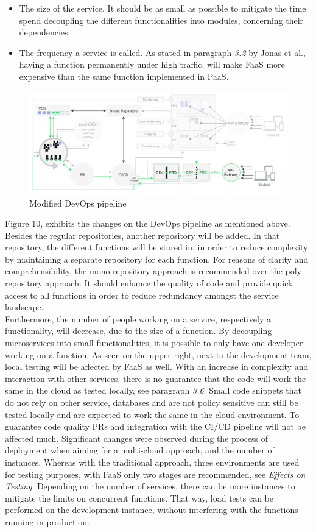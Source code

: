 \documentclass[a4paper,11pt, pagesize]{scrartcl}
\begin{document}
\begin{spacing}{1.2}
\begin{itemize}
  \item[2.] The size of the service. It should be as small as possible to mitigate the time spend decoupling the different functionalities into modules, concerning their dependencies.
  \item[3.] The frequency a service is called. As stated in paragraph \textit{3.2} by Jonas et al., having a function permanently under high traffic, will make FaaS more expensive than the same function implemented in PaaS.
\end{itemize}
\begin{figure}[H]
\label{fig:devopsModified}
\centering
\includegraphics[width=1\textwidth]{devopsModified}
\caption{Modified DevOps pipeline}
\end{figure}
Figure 10, exhibits the changes on the DevOps pipeline as mentioned above. Besides the regular repositories, another repository will be added. In that repository, the different functions will be stored in, in order to reduce complexity by maintaining a separate repository for each function. For reasons of clarity and comprehensibility, the mono-repository approach is recommended over the poly-repository approach. It should enhance the quality of code and provide quick access to all functions in order to reduce redundancy amongst the service landscape. \\Furthermore, the number of people working on a service, respectively a functionality, will decrease, due to the size of a function. By decoupling microservices into small functionalities, it is possible to only have one developer working on a function. As seen on the upper right, next to the development team, local testing will be affected by FaaS as well. With an increase in complexity and interaction with other services, there is no guarantee that the code will work the same in the cloud as tested locally, see paragraph \textit{3.6}. Small code snippets that do not rely on other service, databases and are not policy sensitive can still be tested locally and are expected to work the same in the cloud environment. To guarantee code quality PRs and integration with the CI/CD pipeline will not be affected much. Significant changes were observed during the process of deployment when aiming for a multi-cloud approach, and the number of instances. Whereas with the traditional approach, three environments are used for testing purposes, with FaaS only two stages are recommended, see \textit{Effects on Testing}. Depending on the number of services, there can be more instances to mitigate the limits on concurrent functions. That way, load tests can be performed on the development instance, without interfering with the functions running in production. 
\newpage

\end{spacing}
\end{document}
